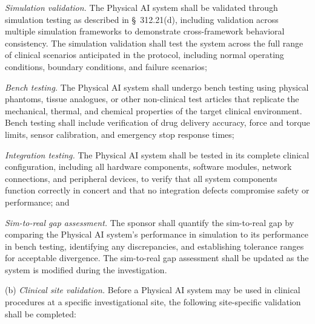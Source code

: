 \begin{description}[leftmargin=0.8cm,style=sameline]
\item[(1)] \textit{Simulation validation.} The Physical AI system shall be validated through simulation testing as described in \S~312.21(d), including validation across multiple simulation frameworks to demonstrate cross-framework behavioral consistency. The simulation validation shall test the system across the full range of clinical scenarios anticipated in the protocol, including normal operating conditions, boundary conditions, and failure scenarios;
\item[(2)] \textit{Bench testing.} The Physical AI system shall undergo bench testing using physical phantoms, tissue analogues, or other non-clinical test articles that replicate the mechanical, thermal, and chemical properties of the target clinical environment. Bench testing shall include verification of drug delivery accuracy, force and torque limits, sensor calibration, and emergency stop response times;
\item[(3)] \textit{Integration testing.} The Physical AI system shall be tested in its complete clinical configuration, including all hardware components, software modules, network connections, and peripheral devices, to verify that all system components function correctly in concert and that no integration defects compromise safety or performance; and
\item[(4)] \textit{Sim-to-real gap assessment.} The sponsor shall quantify the sim-to-real gap by comparing the Physical AI system's performance in simulation to its performance in bench testing, identifying any discrepancies, and establishing tolerance ranges for acceptable divergence. The sim-to-real gap assessment shall be updated as the system is modified during the investigation.
\end{description}

(b) \textit{Clinical site validation.} Before a Physical AI system may be used in clinical procedures at a specific investigational site, the following site-specific validation shall be completed:

